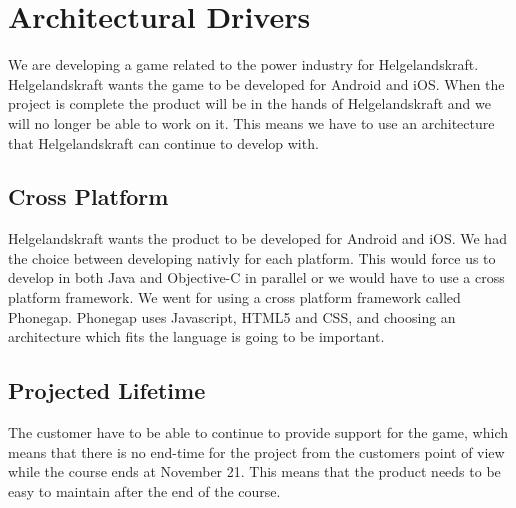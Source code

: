 \section{Architectural Drivers}
We are developing a game related to the power industry for Helgelandskraft. Helgelandskraft 
wants the game to be developed for Android and iOS. When the project is complete the product 
will be in the hands of Helgelandskraft and we will no longer be able to work on it. This means 
we have to use an architecture that Helgelandskraft can continue to develop with.

\subsection*{Cross Platform}
Helgelandskraft wants the product to be developed for Android and iOS. We had the choice between 
developing nativly for each platform. This would force us to develop in both Java and Objective-C 
in parallel or we would have to use a cross platform framework. We went for using a cross platform 
framework called Phonegap. Phonegap uses Javascript, HTML5 and CSS, and choosing an architecture 
which fits the language is going to be important.

\subsection*{Projected Lifetime}
The customer have to be able to continue to provide support for the game, which means that there is 
no end-time for the project from the customers point of view while the course ends at November 21. 
This means that the product needs to be easy to maintain after the end of the course.
